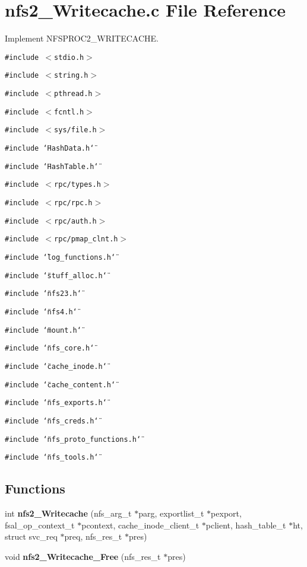 \section{nfs2\_\-Writecache.c File Reference}
\label{nfs2__Writecache_8c}
Implement NFSPROC2\_\-WRITECACHE. 

{\tt \#include $<$stdio.h$>$}\par
{\tt \#include $<$string.h$>$}\par
{\tt \#include $<$pthread.h$>$}\par
{\tt \#include $<$fcntl.h$>$}\par
{\tt \#include $<$sys/file.h$>$}\par
{\tt \#include \char`\"{}Hash\-Data.h\char`\"{}}\par
{\tt \#include \char`\"{}Hash\-Table.h\char`\"{}}\par
{\tt \#include $<$rpc/types.h$>$}\par
{\tt \#include $<$rpc/rpc.h$>$}\par
{\tt \#include $<$rpc/auth.h$>$}\par
{\tt \#include $<$rpc/pmap\_\-clnt.h$>$}\par
{\tt \#include \char`\"{}log\_\-functions.h\char`\"{}}\par
{\tt \#include \char`\"{}stuff\_\-alloc.h\char`\"{}}\par
{\tt \#include \char`\"{}nfs23.h\char`\"{}}\par
{\tt \#include \char`\"{}nfs4.h\char`\"{}}\par
{\tt \#include \char`\"{}mount.h\char`\"{}}\par
{\tt \#include \char`\"{}nfs\_\-core.h\char`\"{}}\par
{\tt \#include \char`\"{}cache\_\-inode.h\char`\"{}}\par
{\tt \#include \char`\"{}cache\_\-content.h\char`\"{}}\par
{\tt \#include \char`\"{}nfs\_\-exports.h\char`\"{}}\par
{\tt \#include \char`\"{}nfs\_\-creds.h\char`\"{}}\par
{\tt \#include \char`\"{}nfs\_\-proto\_\-functions.h\char`\"{}}\par
{\tt \#include \char`\"{}nfs\_\-tools.h\char`\"{}}\par
\subsection*{Functions}
\begin{CompactItemize}
\item 
int {\bf nfs2\_\-Writecache} (nfs\_\-arg\_\-t $\ast$parg, exportlist\_\-t $\ast$pexport, fsal\_\-op\_\-context\_\-t $\ast$pcontext, cache\_\-inode\_\-client\_\-t $\ast$pclient, hash\_\-table\_\-t $\ast$ht, struct svc\_\-req $\ast$preq, nfs\_\-res\_\-t $\ast$pres)
\item 
void {\bf nfs2\_\-Writecache\_\-Free} (nfs\_\-res\_\-t $\ast$pres)
\end{CompactItemize}


